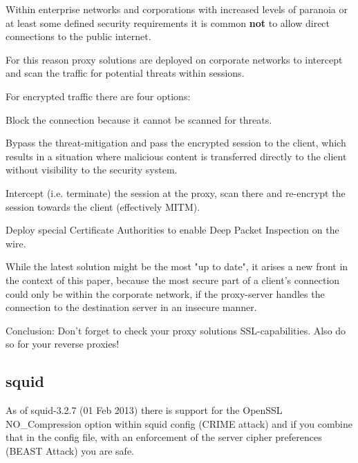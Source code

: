 
Within enterprise networks and corporations with increased levels of paranoia or at least some defined security requirements it is common \textbf{not} to allow direct connections to the public internet.

For this reason proxy solutions are deployed on corporate networks to intercept and scan the traffic for potential threats within sessions.

For encrypted traffic there are four options:

\begin{itemize*}
  \item Block the connection because it cannot be scanned for threats.
  \item Bypass the threat-mitigation and pass the encrypted session to the client, which results in a situation where malicious content is transferred directly to the client without visibility to the security system.
  \item Intercept (i.e. terminate) the session at the proxy, scan there and re-encrypt the session towards the client (effectively MITM).
  \item Deploy special Certificate Authorities to enable Deep Packet Inspection on the wire.
\end{itemize*}

While the latest solution might be the most "up to date", it arises a new front in the context of this paper, because the most secure part of a client's connection could only be within the corporate network, if the proxy-server handles the connection to the destination server in an insecure manner.

Conclusion: Don't forget to check your proxy solutions SSL-capabilities. Also do so for your reverse proxies!

\subsection{squid}
As of squid-3.2.7 (01 Feb 2013) there is support for the OpenSSL NO\_Compression option within squid config (CRIME attack) and if you combine that in the config file, with an enforcement of the server cipher preferences (BEAST Attack) you are safe.


